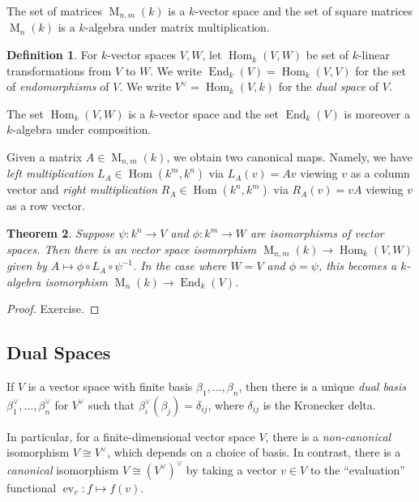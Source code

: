 \documentclass[12pt]{article}
\theoremstyle{plain}
\newtheorem{theorem}{Theorem}[section]
\theoremstyle{definition}
\newtheorem{definition}[theorem]{Definition}
\theoremstyle{remark}
\numberwithin{equation}{section}
\begin{document}
The set of matrices $\operatorname{M}_{n,m}(k)$ is a $k$-vector space
and the set of square matrices $\operatorname{M}_n(k)$ is a $k$-algebra
under matrix multiplication.

\begin{definition}
For $k$-vector spaces $V,W$, let
$\operatorname{Hom}_k(V,W)$ be set of $k$-linear
transformations from $V$ to $W$.
We write $\operatorname{End}_k(V) = \operatorname{Hom}_k(V,V)$
for the set of \emph{endomorphisms} of $V$.
We write $V^\vee = \operatorname{Hom}_k(V,k)$
for the \emph{dual space} of $V$.
\end{definition}

The set $\operatorname{Hom}_k(V,W)$ is a $k$-vector space and the set
$\operatorname{End}_k(V)$ is moreover a $k$-algebra under composition.

Given a matrix $A \in \operatorname{M}_{n,m}(k)$, we obtain
two canonical maps.
Namely, we have \emph{left multiplication}
$L_A \in \operatorname{Hom}(k^m,k^n)$ via $L_A(v)=Av$
viewing $v$ as a column vector
and \emph{right multiplication}
$R_A \in \operatorname{Hom}(k^n,k^m)$ via $R_A(v)=vA$
viewing $v$ as a row vector.

\begin{theorem}
Suppose $\psi: k^n \to V$ and $\phi : k^m \to W$ are isomorphisms of
vector spaces.
Then there is an vector space isomorphism
$\operatorname{M}_{n,m}(k) \to \operatorname{Hom}_k(V,W)$ given by
$A \mapsto \phi \circ L_A \circ \psi^{-1}$.
In the case where $W=V$ and $\phi=\psi$, this becomes a $k$-algebra
isomorphism $\operatorname{M}_n(k) \to \operatorname{End}_k(V)$.
\end{theorem}

\begin{proof}
Exercise.
\end{proof}

\subsection{Dual Spaces}

If $V$ is a vector space with finite basis
$\beta_1, \ldots, \beta_n$, then there is a unique \emph{dual basis}
$\beta^\vee_1, \ldots, \beta^\vee_n$
for $V^\vee$ such that $\beta_i^\vee(\beta_j)=\delta_{ij}$,
where $\delta_{ij}$ is the Kronecker delta.

In particular, for a finite-dimensional vector space $V$,
there is a \emph{non-canonical} isomorphism $V \cong V^\vee$,
which depends on a choice of basis.
In contrast, there is a \emph{canonical} isomorphism
$V \cong (V^\vee)^\vee$ by taking a vector $v \in V$ to the
``evaluation'' functional $\operatorname{ev}_v : f \mapsto f(v)$. 
\end{document}
